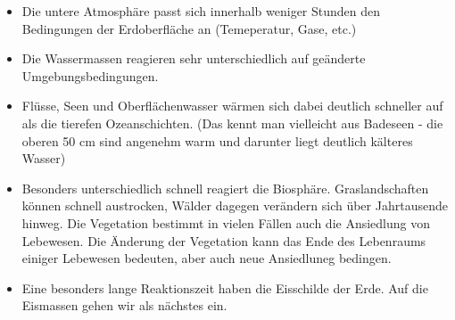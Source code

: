 \begin{frame}
{\begin{itemize}
			\item[] Die untere Atmosphäre passt sich innerhalb weniger Stunden den Bedingungen der Erdoberfläche an (Temeperatur, Gase, etc.)
			\item[] Die Wassermassen reagieren sehr unterschiedlich auf geänderte Umgebungsbedingungen.
			\item[] Flüsse, Seen und Oberflächenwasser wärmen sich dabei deutlich schneller auf als die tierefen Ozeanschichten. (Das kennt man vielleicht aus Badeseen - die oberen 50 cm sind angenehm warm und darunter liegt deutlich kälteres Wasser)
			\item[] Besonders unterschiedlich schnell reagiert die Biosphäre. Graslandschaften können schnell austrocken, Wälder dagegen verändern sich über Jahrtausende hinweg. Die Vegetation bestimmt in vielen Fällen auch die Ansiedlung von Lebewesen. Die Änderung der Vegetation kann das Ende des Lebenraums einiger Lebewesen bedeuten, aber auch neue Ansiedluneg bedingen.
			\item[] Eine besonders lange Reaktionszeit haben die Eisschilde der Erde. Auf die Eismassen gehen wir als nächstes ein.
		\end{itemize}
	}
\end{frame}

